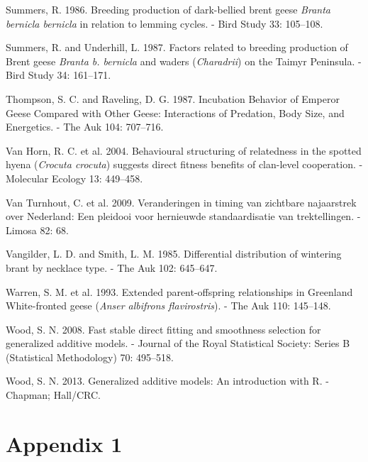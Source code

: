 \documentclass[10pt,twocolumn]{paper}
\begin{document}
\hypertarget{ref-summers1986breeding}{}
Summers, R. 1986. Breeding production of dark-bellied brent geese
\emph{Branta bernicla bernicla} in relation to lemming cycles. - Bird
Study 33: 105--108.

\hypertarget{ref-summers1987factors}{}
Summers, R. and Underhill, L. 1987. Factors related to breeding
production of Brent geese \emph{Branta b. bernicla} and waders
(\emph{Charadrii}) on the Taimyr Peninsula. - Bird Study 34: 161--171.

\hypertarget{ref-thompson1987emperor}{}
Thompson, S. C. and Raveling, D. G. 1987. Incubation Behavior of Emperor
Geese Compared with Other Geese: Interactions of Predation, Body Size,
and Energetics. - The Auk 104: 707--716.

\hypertarget{ref-MEC:MEC2071}{}
Van Horn, R. C. et al. 2004. Behavioural structuring of relatedness in
the spotted hyena (\emph{Crocuta crocuta}) suggests direct fitness
benefits of clan-level cooperation. - Molecular Ecology 13: 449--458.

\hypertarget{ref-van2009veranderingen}{}
Van Turnhout, C. et al. 2009. Veranderingen in timing van zichtbare
najaarstrek over Nederland: Een pleidooi voor hernieuwde standaardisatie
van trektellingen. - Limosa 82: 68.

\hypertarget{ref-vangilder1985differential}{}
Vangilder, L. D. and Smith, L. M. 1985. Differential distribution of
wintering brant by necklace type. - The Auk 102: 645--647.

\hypertarget{ref-10.2307ux2f4088245}{}
Warren, S. M. et al. 1993. Extended parent-offspring relationships in
Greenland White-fronted geese (\emph{Anser albifrons flavirostris}). -
The Auk 110: 145--148.

\hypertarget{ref-wood2008fast}{}
Wood, S. N. 2008. Fast stable direct fitting and smoothness selection
for generalized additive models. - Journal of the Royal Statistical
Society: Series B (Statistical Methodology) 70: 495--518.

\hypertarget{ref-wood2013gam}{}
Wood, S. N. 2013. Generalized additive models: An introduction with R. -
Chapman; Hall/CRC.

\normalsize

\clearpage

\setcounter{table}{0} \renewcommand{\thetable}{A\arabic{table}}

\renewcommand\thefigure{A\arabic{figure}}

\section{Appendix 1}\label{appendix-1}
\end{document}

